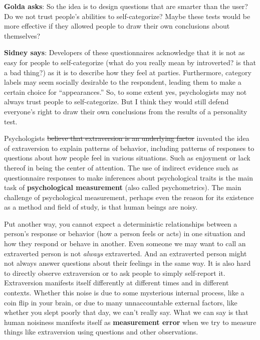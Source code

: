\documentclass[
  openany]{book}
\begin{document}
\begin{tipblock}
\textbf{Golda asks}: So the idea is to design questions that are smarter than the user? Do we not trust people's abilities to self-categorize? Maybe these tests would be more effective if they allowed people to draw their own conclusions about themselves?

\textbf{Sidney says}: Developers of these questionnaires acknowledge that it is not as easy for people to self-categorize (what do you really mean by introverted? is that a bad thing?) as it is to describe how they feel at parties. Furthermore, category labels may seem socially desirable to the respondent, leading them to make a certain choice for ``appearances.'' So, to some extent yes, psychologists may not always trust people to self-categorize. But I think they would still defend everyone's right to draw their own conclusions from the results of a personality test.

\end{tipblock}

Psychologists \sout{believe that extraversion is an underlying factor} invented the idea of extraversion to explain patterns of behavior, including patterns of responses to questions about how people feel in various situations. Such as enjoyment or lack thereof in being the center of attention. The use of indirect evidence such as questionnaire responses to make inferences about psychological traits is the main task of \textbf{psychological measurement} (also called psychometrics). The main challenge of psychological measurement, perhaps even the reason for its existence as a method and field of study, is that human beings are noisy.

Put another way, you cannot expect a deterministic relationships between a person's response or behavior (how a person feels or acts) in one situation and how they respond or behave in another. Even someone we may want to call an extraverted person is not \emph{always} extraverted. And an extraverted person might not always answer questions about their feelings in the same way. It is also hard to directly observe extraversion or to ask people to simply self-report it. Extraversion manifests itself differently at different times and in different contexts. Whether this noise is due to some mysterious internal process, like a coin flip in your brain, or due to many unnaccountable external factors, like whether you slept poorly that day, we can't really say. What we can say is that human noisiness manifests itself as \textbf{measurement error} when we try to measure things like extraversion using questions and other observations.
\end{document}
